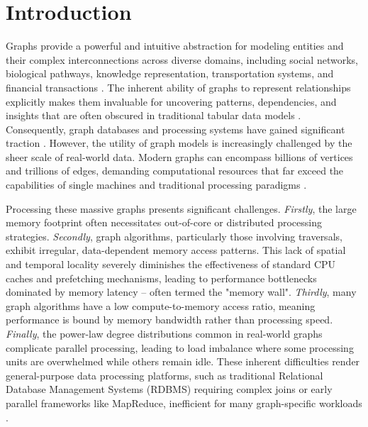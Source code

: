 \documentclass[sigconf,natbib=false]{acmart}
\begin{document}

\maketitle

\section{Introduction}

Graphs provide a powerful and intuitive abstraction for modeling entities and their complex interconnections across diverse domains, including social networks, biological pathways, knowledge representation, transportation systems, and financial transactions \cite{liu2020LargescaleGraphProcessing}.
The inherent ability of graphs to represent relationships explicitly makes them invaluable for uncovering patterns, dependencies, and insights that are often obscured in traditional tabular data models \cite{angles2018FoundationsModernQuery}.
Consequently, graph databases and processing systems have gained significant traction \cite{meckler2024ProcedureModelBuilding}. %
However, the utility of graph models is increasingly challenged by the sheer scale of real-world data.
Modern graphs can encompass billions of vertices and trillions of edges, demanding computational resources that far exceed the capabilities of single machines and traditional processing paradigms \cite{liu2020LargescaleGraphProcessing}.

Processing these massive graphs presents significant challenges.
\textit{Firstly}, the large memory footprint often necessitates out-of-core or distributed processing strategies.
\textit{Secondly}, graph algorithms, particularly those involving traversals, exhibit irregular, data-dependent memory access patterns. %
This lack of spatial and temporal locality severely diminishes the effectiveness of standard CPU caches and prefetching mechanisms, leading to performance bottlenecks dominated by memory latency – often termed the "memory wall".
\textit{Thirdly}, many graph algorithms have a low compute-to-memory access ratio, meaning performance is bound by memory bandwidth rather than processing speed.%
\textit{Finally}, the power-law degree distributions common in real-world graphs complicate parallel processing, leading to load imbalance where some processing units are overwhelmed while others remain idle.%
These inherent difficulties render general-purpose data processing platforms, such as traditional Relational Database Management Systems (RDBMS) requiring complex joins \cite{admin2018NoSQLPerformanceBenchmark} or early parallel frameworks like MapReduce, inefficient for many graph-specific workloads \cite{liu2020LargescaleGraphProcessing}. %
\end{document}
